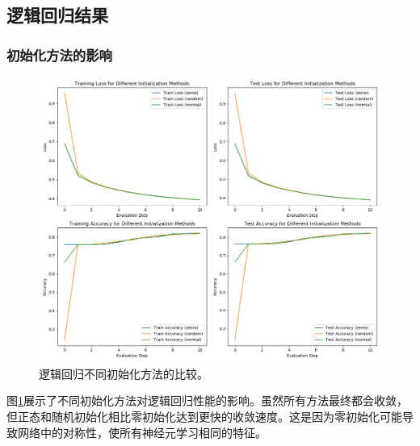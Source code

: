 \documentclass[journal, a4paper]{IEEEtran}
\begin{document}
\begin{CJK}{UTF8}{gbsn}
\subsection{逻辑回归结果}

\subsubsection{初始化方法的影响}
\begin{figure}[htbp]
\centering
\includegraphics[width=\linewidth]{logistic_regression_init_methods.png}
\caption{逻辑回归不同初始化方法的比较。}
\label{fig:lr_init}
\end{figure}

图\ref{fig:lr_init}展示了不同初始化方法对逻辑回归性能的影响。虽然所有方法最终都会收敛，但正态和随机初始化相比零初始化达到更快的收敛速度。这是因为零初始化可能导致网络中的对称性，使所有神经元学习相同的特征。


\end{CJK}
\end{document}
